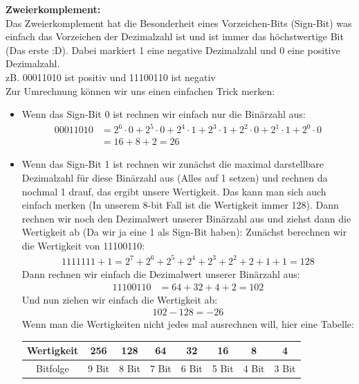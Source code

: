 \documentclass[12pt]{article}
\begin{document}
\begin{flushleft}
    \vspace{1cm}
    \textbf{Zweierkomplement:} \\
    Das Zweierkomplement hat die Besonderheit eines Vorzeichen-Bits (Sign-Bit) was einfach das Vorzeichen der Dezimalzahl ist und ist immer das höchstwertige Bit (Das erste :D).
    Dabei markiert 1 eine negative Dezimalzahl und 0 eine positive Dezimalzahl. \\
    zB. 00011010 ist positiv und 11100110 ist negativ \\
    \vspace{0.5cm}
    Zur Umrechnung können wir uns einen einfachen Trick merken:
    \begin{itemize}
        \item Wenn das Sign-Bit 0 ist rechnen wir einfach nur die Binärzahl aus:
        \begin{align*}
            00011010 &= 2^6 \cdot 0 + 2^5 \cdot 0 + 2^4 \cdot 1 + 2^3 \cdot 1 + 2^2 \cdot 0 + 2^1 \cdot 1 + 2^0 \cdot 0 \\
            &= 16 + 8 + 2 = 26
        \end{align*}
        \item Wenn das Sign-Bit 1 ist rechnen wir zunächst die maximal darstellbare Dezimalzahl für diese Binärzahl aus (Alles auf 1 setzen) 
        und rechnen da nochmal 1 drauf, das ergibt unsere Wertigkeit. 
        Das kann man sich auch einfach merken (In unserem 8-bit Fall ist die Wertigkeit immer 128). 
        Dann rechnen wir noch den Dezimalwert unserer Binärzahl aus und ziehst dann die Wertigkeit ab (Da wir ja eine 1 als Sign-Bit haben): \linebreak
        \linebreak Zunächst berechnen wir die Wertigkeit von 11100110:
        \begin{align*}
            1111111 + 1 = 2^7 + 2^6 + 2^5 + 2^4 + 2^3 + 2^2 + 2 + 1 + 1 = 128
        \end{align*}
        Dann rechnen wir einfach die Dezimalwert unserer Binärzahl aus:
        \begin{align*}
            11100110 &= 64 + 32 + 4 + 2 = 102
        \end{align*}
        Und nun ziehen wir einfach die Wertigkeit ab:
        \begin{align*}
            102 - 128 = -26
        \end{align*}
        Wenn man die Wertigkeiten nicht jedes mal ausrechnen will, 
        hier eine Tabelle: \linebreak \linebreak
        \begin{tabular}{|c|c|c|c|c|c|c|c|}
            \hline
            Wertigkeit & 256 & 128 & 64 & 32 & 16 & 8 & 4 \\
            \hline
            Bitfolge & 9 Bit & 8 Bit & 7 Bit & 6 Bit & 5 Bit  & 4 Bit & 3 Bit \\
            \hline
        \end{tabular}
    \end{itemize}
\end{flushleft}
\end{document}
